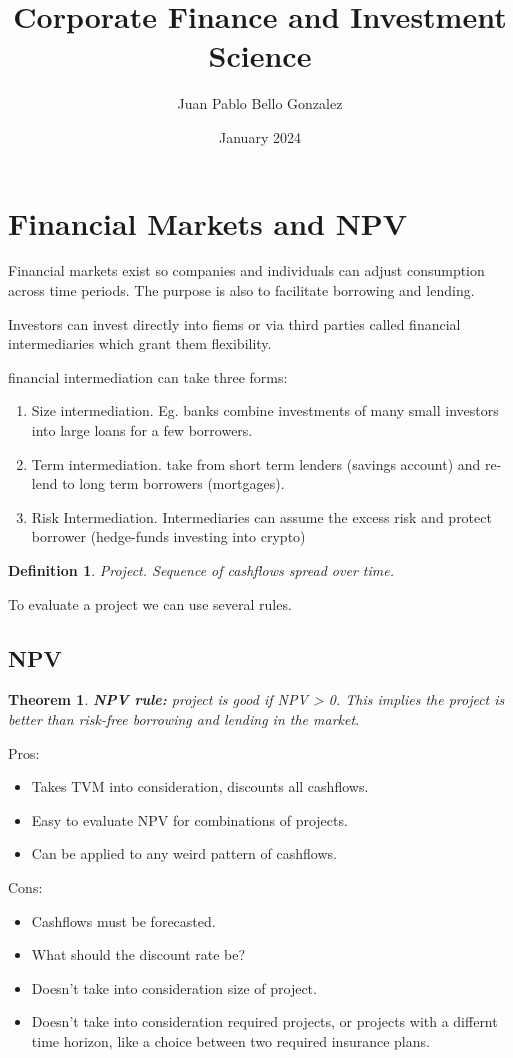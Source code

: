 \documentclass{article}
\title{Corporate Finance and Investment Science}
\author{Juan Pablo Bello Gonzalez}
\date{January 2024}
\newtheorem{definition}{Definition}
\newtheorem{theorem}{Theorem}
\begin{document}
\maketitle

\section{Financial Markets and NPV}
Financial markets exist so companies and individuals can adjust consumption across time periods. The purpose is also to facilitate borrowing and lending.

Investors can invest directly into fiems or via third parties called financial intermediaries which grant them flexibility. 

financial intermediation can take three forms: 
\begin{enumerate}
\item Size intermediation. Eg. banks combine investments of many small investors into large loans for a few borrowers. 
\item Term intermediation. take from short term lenders (savings account) and re-lend to long term borrowers (mortgages).
\item Risk Intermediation. Intermediaries can assume the excess risk and protect borrower (hedge-funds investing into crypto)
\end{enumerate}

\begin{definition}
Project. Sequence of cashflows spread over time. 
\end{definition}

To evaluate a project we can use several rules. 
\subsection{NPV}
\begin{theorem}
\textbf{NPV rule:} project is good if NPV > 0. This implies the project is better than risk-free borrowing and lending in the market. 
\end{theorem}
Pros:
\begin{itemize}
\item Takes TVM into consideration, discounts all cashflows. 
\item Easy to evaluate NPV for combinations of projects. 
\item Can be applied to any weird pattern of cashflows. 
\end{itemize}

Cons: 
\begin{itemize}
\item Cashflows must be forecasted. 
\item What should the discount rate be?
\item Doesn't take into consideration size of project. 
\item Doesn't take into consideration required projects, or projects with a differnt time horizon, like a choice between two required insurance plans. 
\end{itemize}
\end{document}
